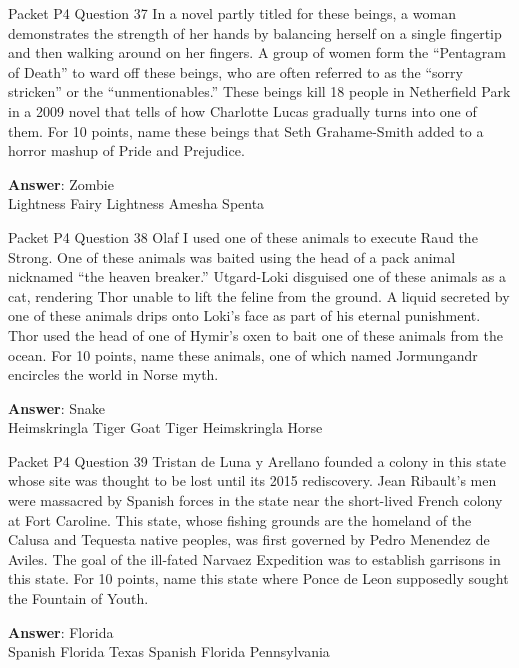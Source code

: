 \begin{frame}{Packet P4 Question 37}
In a novel partly titled   for these beings, a woman demonstrates the strength of her hands by balancing herself on a single fingertip and then walking around on her fingers. A group of women form the “Pentagram of Death” to ward off these beings, who are often referred to as the “sorry stricken” or the “unmentionables.” These beings kill 18 people in Netherfield Park in a 2009 novel that tells of how Charlotte Lucas gradually turns into one of them. For 10 points, name these beings that Seth Grahame-Smith added to a horror mashup of Pride and Prejudice.        

\textbf{Answer}: Zombie\\
 Lightness
 Fairy
 Lightness
 Amesha Spenta
\end{frame}

\begin{frame}{Packet P4 Question 38}
Olaf I used one of these   animals to execute Raud the Strong. One of these animals was baited using the   head of a pack animal nicknamed “the heaven breaker.” Utgard-Loki disguised one of these animals as a cat, rendering Thor unable to lift the feline from the ground. A liquid secreted by one of these animals drips onto Loki’s face as part of his eternal punishment. Thor used the head of one of Hymir’s oxen to bait one of these animals from the ocean. For 10 points, name these animals, one of which named Jormungandr encircles the world in Norse myth.        

\textbf{Answer}: Snake\\
 Heimskringla
 Tiger
 Goat
 Tiger
 Heimskringla
 Horse
\end{frame}

\begin{frame}{Packet P4 Question 39}
Tristan de Luna y Arellano founded a colony in this state whose site was thought to be lost until its 2015 rediscovery. Jean Ribault’s men were massacred by Spanish forces in the state near the short-lived French colony at Fort Caroline. This state, whose fishing grounds are the homeland of the Calusa and Tequesta native   peoples, was first governed by Pedro Menendez de Aviles. The goal of the ill-fated Narvaez Expedition was to establish garrisons in this state. For 10 points, name this state where Ponce de Leon supposedly sought the Fountain of Youth.        

\textbf{Answer}: Florida\\
 Spanish Florida
 Texas
 Spanish Florida
 Pennsylvania
\end{frame}

